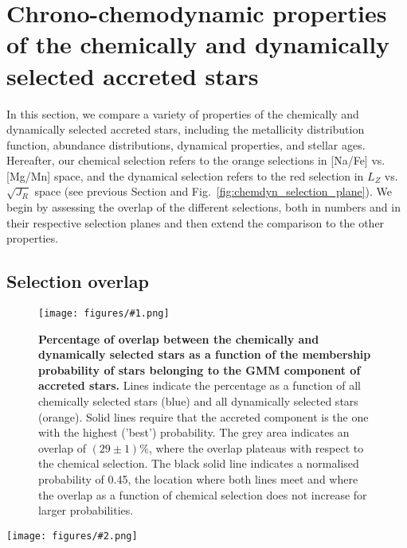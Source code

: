 \documentclass[fleqn,usenatbib]{mnras}
\newcommand{\codeicon}{{\faCloudDownload}}
\newcommand{\codelink}[1]{\href{https://github.com/svenbuder/Accreted-stars-in-GALAH-DR3/tree/main/figures/#1.ipynb}{\codeicon}\,\,}
\newcommand{\oscaption}[2]{\caption{#2 \codelink{#1}}}
\newcommand{\figuretextwidth}[4]{\begin{figure*} \centering \texttt{[image: figures/\#2.png]}\oscaption{#3}{#4}\label{fig:#2} \end{figure*}}
\newcommand{\figurecolumnwidth}[3]{\begin{figure} \centering \texttt{[image: figures/\#1.png]}\oscaption{#2}{#3}\label{fig:#1} \end{figure}}
\begin{document}
\section{Chrono-chemodynamic properties of the chemically and dynamically selected accreted stars} \label{sec:chronochemodynamics}

In this section, we compare a variety of properties of the chemically and dynamically selected accreted stars, including the metallicity distribution function, abundance distributions, dynamical properties, and stellar ages. Hereafter, our chemical selection refers to the orange selections in [Na/Fe] vs. [Mg/Mn] space, and the dynamical selection refers to the red selection in $L_Z$ vs. $\sqrt{J_R}$ space (see previous Section and Fig.~\ref{fig:chemdyn_selection_plane}). We begin by assessing the overlap of the different selections, both in numbers and in their respective selection planes and then extend the comparison to the other properties.

\subsection{Selection overlap} \label{sec:overlap_planes}

\figurecolumnwidth{quantitative_overlap_chemdyn}{chronochemodynamic_comparison}{
\textbf{Percentage of overlap between the chemically and dynamically selected stars as a function of the membership probability of stars belonging to the GMM component of accreted stars.} Lines indicate the percentage as a function of all chemically selected stars (blue) and all dynamically selected stars (orange). Solid lines require that the accreted component is the one with the highest ('best') probability. The grey area indicates an overlap of $(29\pm1)\%$, where the overlap plateaus with respect to the chemical selection. The black solid line indicates a normalised probability of 0.45, the location where both lines meet and where the overlap as a function of chemical selection does not increase for larger probabilities.
}

\figuretextwidth{17cm}{chemdyn_selection_plane}{chronochemodynamic_comparison}{
\textbf{Comparison of chemical and dynamical selections in their respective planes, [Na/Fe] vs. [Mg/Mn] (top panels) and $L_Z$ vs. $\sqrt{J_R}$, respectively.}
\textbf{Left panels (a and d):} Chemical selection (orange).
\textbf{Middle panels (b and e):} Overlap of chemical and dynamical selection (purple).
\textbf{Right panels (c and f):} Dynamical selection (red).
Black background contours show the GALAH+ DR3 sample.
}
\end{document}
